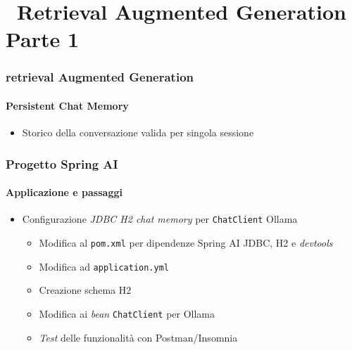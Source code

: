 \section{\faWrench\ Retrieval Augmented Generation\\{\small Parte 1}} %
\label{sec:spring-ai-rag-part-1}
%
\begin{frame}[t,fragile] \frametitle{retrieval Augmented Generation}
    \framesubtitle{Persistent Chat Memory}
    {\footnotesize
    \begin{itemize}[leftmargin=10pt,align=right]
        \item[\alert{\faExclamationTriangle}] Storico della conversazione valida per singola sessione
    \end{itemize}
    }
\end{frame}
%
\begin{frame}[t,fragile] \frametitle{Progetto Spring AI}
    \framesubtitle{Applicazione e passaggi}
    {\small
    \begin{itemize}[leftmargin=10pt,align=right]
        \item[\alert{\faArrowCircleRight}] Configurazione \textit{JDBC H2 chat memory} per \texttt{ChatClient} Ollama
        \begin{itemize}[leftmargin=10pt,align=right]
            \item[\alertedcircled{1}] Modifica al \texttt{pom.xml} per dipendenze Spring AI JDBC, H2 e \textit{devtools}
            \item[\alertedcircled{2}] Modifica ad \texttt{application.yml}
            \item[\alertedcircled{3}] Creazione schema H2
            \item[\alertedcircled{4}] Modifica ai \textit{bean} \texttt{ChatClient} per Ollama
            \item[\alertedcircled{5}] \textit{Test} delle funzionalità con Postman/Insomnia
        \end{itemize}
    \end{itemize}
    }
\end{frame}
%
